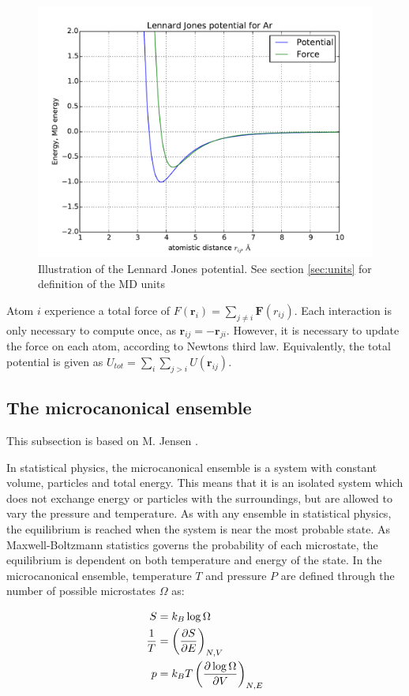 \begin{figure}[H]
	\centering
	\includegraphics[width=0.7\linewidth]{../figures/LJ}
	\caption{Illustration of the Lennard Jones potential. See section \ref{sec:units} for definition of the MD units}
	\label{fig:lj}
\end{figure}


Atom $ i $ experience a total force of $ F(\textbf{r}_i) =  \sum\limits_{j\neq i}   \textbf{F}(r_{ij})$. Each interaction is only necessary to compute once, as $ \textbf{r}_{ij}  = - \textbf{r}_{ji} $. However, it is necessary to update the force on each atom, according to Newtons third law. Equivalently, the total potential is given as $ U_{tot} =  \sum\limits_{i} \sum\limits_{j>i} 	U(\textbf{r}_{ij}) $. 



\subsection{The microcanonical ensemble}
This subsection is based on M. Jensen \cite{Jensen}. 

In statistical physics, the microcanonical ensemble is a system with constant volume, particles and total energy. This means that it is an isolated system which does not exchange energy or particles  with the surroundings, but are allowed to vary the pressure and temperature. As with any ensemble in statistical physics, the equilibrium is reached when the system is near the most probable state. As Maxwell-Boltzmann statistics governs the probability of each microstate, the equilibrium is dependent on both temperature and energy of the state. In the microcanonical ensemble, temperature $ T $ and pressure $ P $ are defined through the number of possible microstates $ \Omega $ as:

\begin{align}
S &= k_B\log \Omega\\
\frac{1}{T} &= \left(  	\pdv{S}{E}	\right)_{N,V} \label{eq:T}\\
p &= k_BT \left(	\pdv{\log\Omega	}{V}	\right)_{N,E} \label{eq:P}
\end{align}


